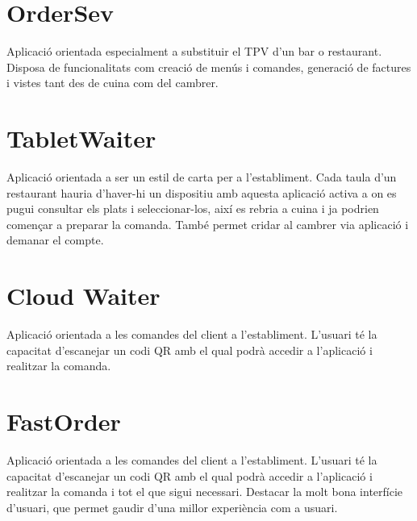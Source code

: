\section{OrderSev}

Aplicació\cite{ordersev} orientada especialment a substituir el TPV d'un bar o restaurant. Disposa de funcionalitats com creació de menús i comandes, generació de factures i vistes tant des de cuina com del cambrer.


\section{TabletWaiter}

Aplicació\cite{tabletwaiter} orientada a ser un estil de carta per a l'establiment. Cada taula d'un restaurant hauria d'haver-hi un dispositiu amb aquesta aplicació activa a on es pugui consultar els plats i seleccionar-los, així es rebria a cuina i ja podrien començar a preparar la comanda. També permet cridar al cambrer via aplicació i demanar el compte.


\section{Cloud Waiter}

Aplicació\cite{cloudwaiter} orientada a les comandes del client a l'establiment. L'usuari té la capacitat d'escanejar un codi QR amb el qual podrà accedir a l'aplicació i realitzar la comanda.


\section{FastOrder}

Aplicació\cite{fastorder} orientada a les comandes del client a l'establiment. L'usuari té la capacitat d'escanejar un codi QR amb el qual podrà accedir a l'aplicació i realitzar la comanda i tot el que sigui necessari. Destacar la molt bona interfície d'usuari, que permet gaudir d'una millor experiència com a usuari.


